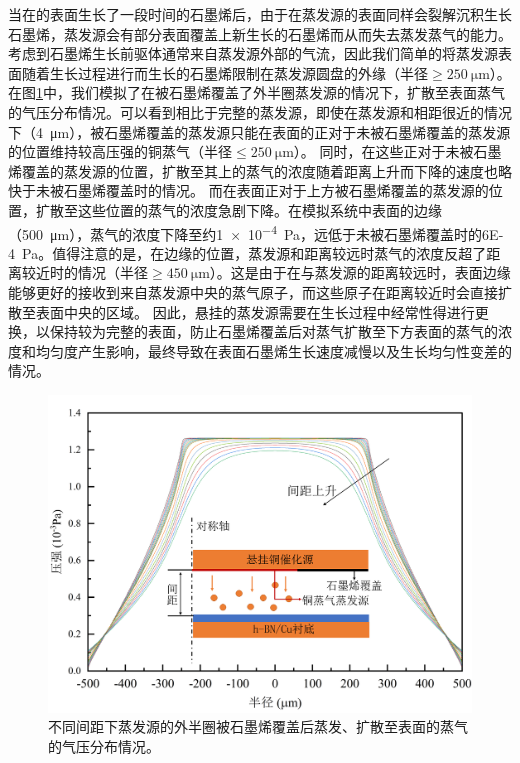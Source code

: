     当在的表面生长了一段时间的石墨烯后，由于在蒸发源的表面同样会裂解沉积生长石墨烯，蒸发源会有部分表面覆盖上新生长的石墨烯而从而失去蒸发蒸气的能力。考虑到石墨烯生长前驱体通常来自蒸发源外部的气流，因此我们简单的将蒸发源表面随着生长过程进行而生长的石墨烯限制在蒸发源圆盘的外缘（半径$\geqslant \SI{250}{\micro\meter}$）。在图\ref{fig:CG_FEM_halfCu}中，我们模拟了在被石墨烯覆盖了外半圈蒸发源的情况下，扩散至表面蒸气的气压分布情况。可以看到相比于完整的蒸发源，即使在蒸发源和相距很近的情况下（\SI{4}{\micro\meter}），被石墨烯覆盖的蒸发源只能在表面的正对于未被石墨烯覆盖的蒸发源的位置维持较高压强的铜蒸气（半径$\leqslant \SI{250}{\micro\meter}$）。
    同时，在这些正对于未被石墨烯覆盖的蒸发源的位置，扩散至其上的蒸气的浓度随着距离上升而下降的速度也略快于未被石墨烯覆盖时的情况。
    而在表面正对于上方被石墨烯覆盖的蒸发源的位置，扩散至这些位置的蒸气的浓度急剧下降。在模拟系统中表面的边缘（\SI{500}{\micro\meter}），蒸气的浓度下降至约\SI{1e-4}{\pascal}，远低于未被石墨烯覆盖时的\SI{6E-4}{\pascal}。值得注意的是，在边缘的位置，蒸发源和距离较远时蒸气的浓度反超了距离较近时的情况（半径$\geqslant \SI{450}{\micro\meter}$）。这是由于在与蒸发源的距离较远时，表面边缘能够更好的接收到来自蒸发源中央的蒸气原子，而这些原子在距离较近时会直接扩散至表面中央的区域。
    因此，悬挂的蒸发源需要在生长过程中经常性得进行更换，以保持较为完整的表面，防止石墨烯覆盖后对蒸气扩散至下方表面的蒸气的浓度和均匀度产生影响，最终导致在表面石墨烯生长速度减慢以及生长均匀性变差的情况。

    \begin{figure}[htb]
        \includegraphics{pic/CG_FEM_halfCu.png}
        \caption{不同间距下蒸发源的外半圈被石墨烯覆盖后蒸发、扩散至表面的蒸气的气压分布情况。}
        \label{fig:CG_FEM_halfCu}
    \end{figure}

